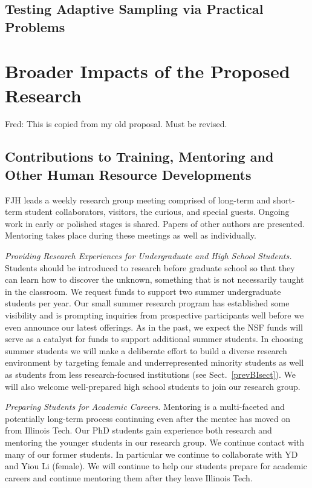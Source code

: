 \documentclass[11pt]{NSFamsart}
\newcommand{\FJHNote}[1]{{\color{blue}Fred: #1}}
\begin{document}
\subsection{Testing Adaptive Sampling via Practical Problems} \label{sec:TestBed}



\section{Broader Impacts of the Proposed Research}\label{SectBroad}
\FJHNote{This is copied from my old proposal.  Must be revised.}


\subsection{Contributions to Training, Mentoring and Other Human Resource Developments}
FJH leads a weekly research group meeting comprised of long-term and short-term student 
collaborators, visitors, the curious, and special guests.  Ongoing work in early or polished stages is shared.  Papers of other authors are presented.  Mentoring takes place during these meetings as well as individually.

\emph{Providing Research Experiences for Undergraduate and High School Students.} Students 
should be introduced to research before graduate school so that they can learn how to 
discover the unknown, something that is not necessarily taught in the classroom. We request funds 
to 
support two summer undergraduate students per year.  Our small summer research program has established some visibility 
and is prompting inquiries from prospective participants well before we 
even announce our latest 
offerings. As in the past, we expect the NSF funds will serve as a catalyst for funds to 
support additional summer students. In choosing summer students we will make a deliberate effort to 
build 
a diverse research environment by targeting female and underrepresented minority students as well 
as students from less research-focused institutions (see Sect.~\ref{prevBIsect}). We will also 
welcome well-prepared high school students to join our research group.

\emph{Preparing Students for Academic Careers.} Mentoring is a multi-faceted and 
potentially long-term process continuing even after the mentee has moved on from Illinois Tech.  
Our PhD students gain experience both research and mentoring the younger students in our 
research group.  We 
continue contact with many of our former students.  In particular we continue to 
collaborate with YD and Yiou Li (female).  We will continue to help our students prepare for 
academic careers and continue mentoring them after they leave Illinois Tech.
\end{document}
